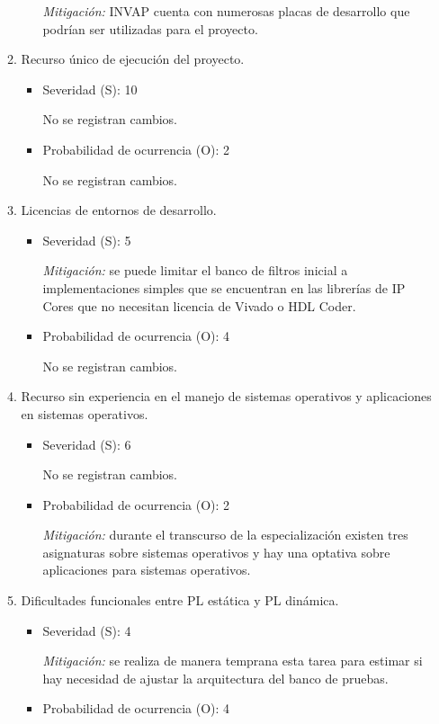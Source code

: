 \documentclass[
11pt, %
]{charter}
\begin{document}
\begin{enumerate}[]
\begin{enumerate}[$\text{Riesgo}$ 1:, leftmargin=*,align=left]
\begin{itemize}
			\emph{Mitigación:} INVAP cuenta con numerosas placas de desarrollo que podrían ser utilizadas para el proyecto.
		\end{itemize}

		\item Recurso único de ejecución del proyecto.
		\begin{itemize}
			\item Severidad (S): 10
			
			No se registran cambios.
			\item Probabilidad de ocurrencia (O): 2
			
			No se registran cambios.
		\end{itemize}

		\item Licencias de entornos de desarrollo.
		\begin{itemize}
			\item Severidad (S): 5
			
			\emph{Mitigación:} se puede limitar el banco de filtros inicial a implementaciones simples que se encuentran en las librerías de IP Cores que no necesitan licencia de Vivado o HDL Coder.
			\item Probabilidad de ocurrencia (O): 4
			
			No se registran cambios.
		\end{itemize}
	
		\item Recurso sin experiencia en el manejo de sistemas operativos y aplicaciones en sistemas operativos.
		\begin{itemize}
			\item Severidad (S): 6
			
			No se registran cambios.
			\item Probabilidad de ocurrencia (O): 2
			
			\emph{Mitigación:} durante el transcurso de la especialización existen tres asignaturas sobre sistemas operativos y hay una optativa sobre aplicaciones para sistemas operativos.
		\end{itemize}

		\item Dificultades funcionales entre PL estática y PL dinámica.
		\begin{itemize}
			\item Severidad (S): 4
			
			\emph{Mitigación:} se realiza de manera temprana esta tarea para estimar si hay necesidad de ajustar la arquitectura del banco de pruebas.
			\item Probabilidad de ocurrencia (O): 4
			

\end{itemize}
\end{enumerate}
\end{enumerate}
\end{document}

